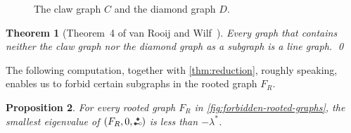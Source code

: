 \documentclass[11pt]{article}
\newtheorem{theorem}{Theorem}[section]
\newtheorem{proposition}[theorem]{Proposition}
\theoremstyle{definition}
\theoremstyle{remark}
\newcommand{\las}{\lambda^*}
\newcommand{\etwo}{\tikz[baseline=-0.2ex, scale=0.9]{\draw[darkgray, thick] (0,0)--(0.2,0); \draw[darkgray, fill=darkgray] (0,0) circle (0.05); \draw[darkgray, fill=darkgray] (0.1,0.17320508075) circle (0.05); \draw[darkgray, fill=white] (0.2,0) circle (0.05);}}
\newcommand{\ape}[1]{(#1,\etwo)}
\begin{document}
\begin{figure}
    \centering
    \caption{The claw graph $C$ and the diamond graph $D$.} \label{fig:claw-and-diamond}
\end{figure}

\begin{theorem}[Theorem~4 of van Rooij and Wilf~\cite{RW65}] \label{thm:claw-diamond}
    Every graph that contains neither the claw graph nor the diamond graph as a subgraph is a line graph. \qed
\end{theorem}

The following computation, together with \cref{thm:reduction}, roughly speaking, enables us to forbid certain subgraphs in the rooted graph $F_R$.

\begin{proposition} \label{lem:forbidden-rooted-graph}
    For every rooted graph $F_R$ in \cref{fig:forbidden-rooted-graphs}, the smallest eigenvalue of $\ape{F_R, 0}$ is less than $-\las$.
\end{proposition}
\end{document}

